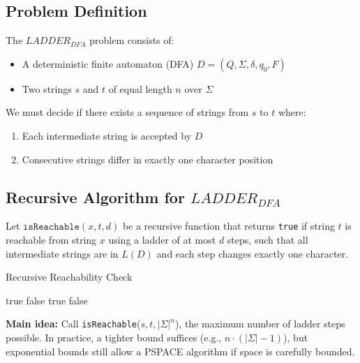 \subsection{Problem Definition}
The \boldmath$LADDER_{DFA}$ problem consists of:
\begin{itemize}
    \item A deterministic finite automaton (DFA) $D = (Q, \Sigma, \delta, q_0, F)$
    \item Two strings $s$ and $t$ of equal length $n$ over $\Sigma$
\end{itemize}
We must decide if there exists a sequence of strings from $s$ to $t$ where:
\begin{enumerate}
    \item Each intermediate string is accepted by $D$
    \item Consecutive strings differ in exactly one character position
\end{enumerate}

\subsection*{Recursive Algorithm for \boldmath$LADDER_{DFA}$}

Let $\texttt{isReachable}(x, t, d)$ be a recursive function that returns \texttt{true} if string $t$ is reachable from string $x$ using a ladder of at most $d$ steps, such that all intermediate strings are in $L(D)$ and each step changes exactly one character.

\begin{algorithm}[H]
\caption{Recursive Reachability Check}
\begin{algorithmic}[1]
        \State \Return true
    \EndIf
        \State \Return false
    \EndIf
                \State \Return true
            \EndIf
        \EndIf
    \EndFor
    \State \Return false
\EndFunction
\end{algorithmic}
\end{algorithm}

\textbf{Main idea:} Call \texttt{isReachable}($s, t, |\Sigma|^n$), the maximum number of ladder steps possible. In practice, a tighter bound suffices (e.g., $n \cdot (|\Sigma| - 1)$), but exponential bounds still allow a PSPACE algorithm if space is carefully bounded.

